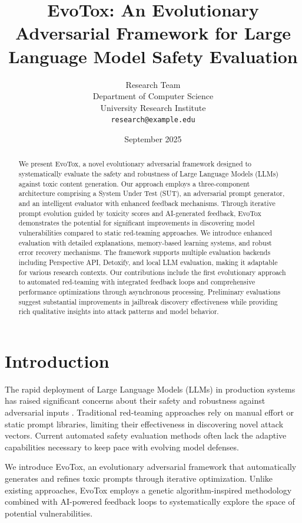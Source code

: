 \documentclass[11pt,twocolumn]{article}
\title{EvoTox: An Evolutionary Adversarial Framework for Large Language Model Safety Evaluation}
\author{
Research Team\\
Department of Computer Science\\
University Research Institute\\
\texttt{research@example.edu}
}
\date{September 2025}
\begin{document}
\maketitle

\begin{abstract}
We present EvoTox, a novel evolutionary adversarial framework designed to systematically evaluate the safety and robustness of Large Language Models (LLMs) against toxic content generation. Our approach employs a three-component architecture comprising a System Under Test (SUT), an adversarial prompt generator, and an intelligent evaluator with enhanced feedback mechanisms. Through iterative prompt evolution guided by toxicity scores and AI-generated feedback, EvoTox demonstrates the potential for significant improvements in discovering model vulnerabilities compared to static red-teaming approaches. We introduce enhanced evaluation with detailed explanations, memory-based learning systems, and robust error recovery mechanisms. The framework supports multiple evaluation backends including Perspective API, Detoxify, and local LLM evaluation, making it adaptable for various research contexts. Our contributions include the first evolutionary approach to automated red-teaming with integrated feedback loops and comprehensive performance optimizations through asynchronous processing. Preliminary evaluations suggest substantial improvements in jailbreak discovery effectiveness while providing rich qualitative insights into attack patterns and model behavior.
\end{abstract}

\section{Introduction}

The rapid deployment of Large Language Models (LLMs) in production systems has raised significant concerns about their safety and robustness against adversarial inputs \cite{openai2023gpt4}. Traditional red-teaming approaches rely on manual effort or static prompt libraries, limiting their effectiveness in discovering novel attack vectors. Current automated safety evaluation methods often lack the adaptive capabilities necessary to keep pace with evolving model defenses.

We introduce EvoTox, an evolutionary adversarial framework that automatically generates and refines toxic prompts through iterative optimization. Unlike existing approaches, EvoTox employs a genetic algorithm-inspired methodology combined with AI-powered feedback loops to systematically explore the space of potential vulnerabilities.
\end{document}
